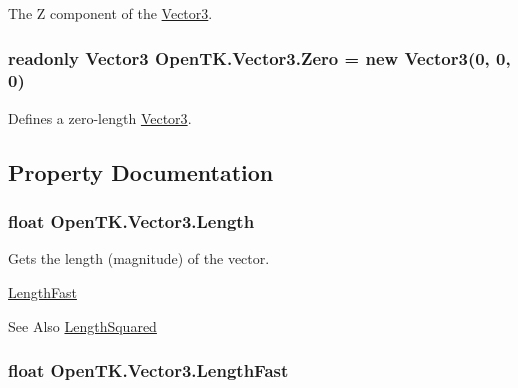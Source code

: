 The Z component of the \hyperlink{struct_open_t_k_1_1_vector3}{Vector3}. 

\hypertarget{struct_open_t_k_1_1_vector3_ab4f0cf5c4aa3471bdde372676cbaa3a5}{
\subsubsection[{Zero}]{\setlength{\rightskip}{0pt plus 5cm}readonly {\bf Vector3} Open\-T\-K.\-Vector3.\-Zero = new {\bf Vector3}(0, 0, 0)\hspace{0.3cm}{\ttfamily [static]}}}\label{struct_open_t_k_1_1_vector3_ab4f0cf5c4aa3471bdde372676cbaa3a5}


Defines a zero-\/length \hyperlink{struct_open_t_k_1_1_vector3}{Vector3}. 



\subsection{Property Documentation}
\hypertarget{struct_open_t_k_1_1_vector3_a628fb895a38c0d423479e16a9309a64b}{
\subsubsection[{Length}]{\setlength{\rightskip}{0pt plus 5cm}float Open\-T\-K.\-Vector3.\-Length\hspace{0.3cm}{\ttfamily [get]}}}\label{struct_open_t_k_1_1_vector3_a628fb895a38c0d423479e16a9309a64b}


Gets the length (magnitude) of the vector. 

\hyperlink{struct_open_t_k_1_1_vector3_ab76d7854a462ae971dc5b10947f34619}{Length\-Fast} \begin{DoxySeeAlso}{See Also}
\hyperlink{struct_open_t_k_1_1_vector3_a160290ae46295484dfa7d564dce347f4}{Length\-Squared}


\end{DoxySeeAlso}
\hypertarget{struct_open_t_k_1_1_vector3_ab76d7854a462ae971dc5b10947f34619}{
\subsubsection[{Length\-Fast}]{\setlength{\rightskip}{0pt plus 5cm}float Open\-T\-K.\-Vector3.\-Length\-Fast\hspace{0.3cm}{\ttfamily [get]}}}\label{struct_open_t_k_1_1_vector3_ab76d7854a462ae971dc5b10947f34619}


